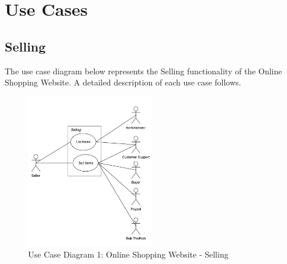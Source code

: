 \documentclass[11pt]{article}
\newcounter{use case ID}
\begin{document}
\clearpage


\section{Use Cases}
\subsection{Selling}

The use case diagram below represents the Selling functionality of the Online Shopping Website. A detailed description of each use case follows.

\begin{figure}[htbp]
    \centering
    \includegraphics[width=0.5\textwidth]{ucd1.png}
    \caption{Use Case Diagram 1: Online Shopping Website - Selling }
    \label{fig:ucd1}
\end{figure}
\end{document}
